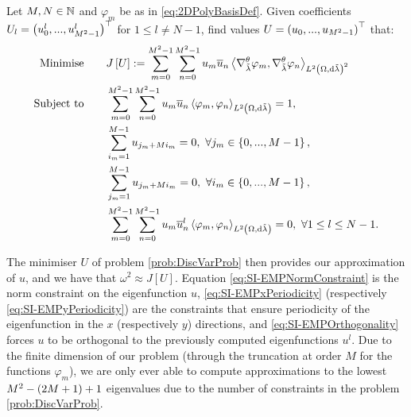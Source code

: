 \begin{problem} \label{prob:DiscVarProb}
	Let $M,N\in\mathbb{N}$ and $\varphi_m$ be as in \eqref{eq:2DPolyBasisDef}.
	Given coefficients $U_l=\left( u^l_0,...,u^l_{M^2-1} \right)^\top$ for $1\leq l\neq N-1$, find values $U=\left( u_0,...,u_{M^2-1} \right)^\top$ that:
	\begin{subequations} \label{eq:SI-ExampleMinProb}
		\begin{align}
			\text{Minimise} \quad & \quad J\left[ U \right] := \sum_{m=0}^{M^2-1}\sum_{n=0}^{M^2-1}u_m\overline{u}_n\left\langle \nabla^{\theta}_{\tilde{\lambda}}\varphi_m , \nabla^{\theta}_{\tilde{\lambda}}\varphi_n \right\rangle_{L^{2}\left( \Omega,\mathrm{d}\tilde{\lambda} \right)^2} 
			\label{eq:SI-EMPObjectiveFn} \\
			\text{Subject to} \quad & \quad \sum_{m=0}^{M^2-1}\sum_{n=0}^{M^2-1}u_m\overline{u}_n\left\langle \varphi_m , \varphi_n \right\rangle_{L^{2}\left( \Omega,\mathrm{d}\tilde{\lambda} \right)} = 1, 
			\label{eq:SI-EMPNormConstraint} \\
			& \quad \sum_{i_m=1}^{M-1}u_{j_m+Mi_m} = 0, \ \forall j_m\in\left\{ 0,...,M-1 \right\}, 
			\label{eq:SI-EMPxPeriodicity} \\
			& \quad \sum_{j_m=1}^{M-1}u_{j_m+Mi_m} = 0, \ \forall i_m\in\left\{ 0,...,M-1 \right\},
			\label{eq:SI-EMPyPeriodicity} \\
			& \quad \sum_{m=0}^{M^2-1}\sum_{n=0}^{M^2-1}u_m\overline{u}^l_n\left\langle \varphi_m , \varphi_n \right\rangle_{L^{2}\left( \Omega,\mathrm{d}\tilde{\lambda} \right)} = 0, \ \forall 1\leq l\leq N-1.
			\label{eq:SI-EMPOrthogonality}
		\end{align}
	\end{subequations}
\end{problem}
The minimiser $U$ of problem \ref{prob:DiscVarProb} then provides our approximation of $u$, and we have that $\omega^2 \approx J[U]$.
Equation \eqref{eq:SI-EMPNormConstraint} is the norm constraint on the eigenfunction $u$, \eqref{eq:SI-EMPxPeriodicity} (respectively \eqref{eq:SI-EMPyPeriodicity}) are the constraints that ensure periodicity of the eigenfunction in the $x$ (respectively $y$) directions, and \eqref{eq:SI-EMPOrthogonality} forces $u$ to be orthogonal to the previously computed eigenfunctions $u^l$.
Due to the finite dimension of our problem (through the truncation at order $M$ for the functions $\varphi_m$), we are only ever able to compute approximations to the lowest $M^2 - \left( 2M + 1 \right) + 1$ eigenvalues due to the number of constraints in the problem \ref{prob:DiscVarProb}.


